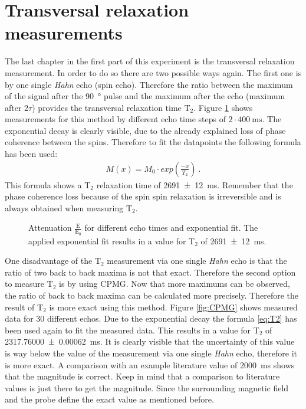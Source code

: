 \section{Transversal relaxation measurements}
\label{sec:Transversalrelaxationmeasurements}
The last chapter in the first part of this experiment is the transversal relaxation measurement. In order to do so there are two possible ways again.\newline
The first one is by one single \textit{Hahn} echo (spin echo). Therefore the ratio between the maximum of the signal after the \SI{90}{\degree} pulse and the maximum after the echo (maximum after $2\tau$) provides the transversal relaxation time T$_2$. Figure \ref{fig:T2} shows measurements for this method by different echo time steps of $2\cdot \SI{400}{\milli \second}$. The exponential decay is clearly visible, due to the already explained loss of phase coherence between the spins. Therefore to fit the datapoints the following formula has been used:
\begin{align}
    M(x)=M_0 \cdot exp\left(\frac{-x}{T_{2}}\right) \ .
 \label{eq:T2}
\end{align}
This formula shows a T$_2$ relaxation time of \SI{2691 \pm 12}{\milli \second}. Remember that the phase coherence loss because of the spin spin relaxation is irreversible and is always obtained when measuring T$_2$.

\begin{figure}[H]
    \centering
    
    \caption[Attenuation $\frac{\text{E}}{\text{E}_0}$ for different echo times and exponential fit.]{Attenuation $\frac{\text{E}}{\text{E}_0}$ for different echo times and exponential fit. The applied exponential fit results in a value for T$_2$ of \SI{2691 \pm 12}{\milli \second}.}
    \label{fig:T2}
\end{figure}

One disadvantage of the T$_2$ measurement via one single \textit{Hahn} echo is that the ratio of two back to back maxima is not that exact. Therefore the second option to measure T$_2$ is by using CPMG. Now that more maximums can be observed, the ratio of back to back maxima can be calculated more precisely. Therefore the result of T$_2$ is more exact using this method. Figure \ref{fig:CPMG} shows measured data for 30 different echos. Due to the exponential decay the formula \eqref{eq:T2} has been used again to fit the measured data. This results in a value for T$_2$ of \SI{2317.76000 \pm 0.00062}{\milli \second}. It is clearly visible that the uncertainty of this value is way below the value of the measurement via one single \textit{Hahn} echo, therefore it is more exact. A comparison with an example literature value of \SI{2000}{\milli \second} \cite{literaturT1} shows that the magnitude is correct. Keep in mind that a comparison to literature values is just there to get the magnitude. Since the surrounding magnetic field and the probe define the exact value as mentioned before.

